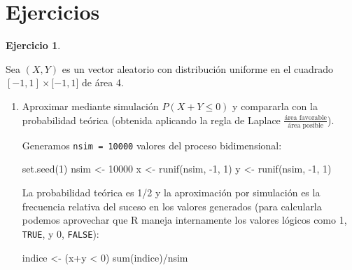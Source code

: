 \documentclass[
]{book}
\newenvironment{Shaded}{\begin{snugshade}}{\end{snugshade}}
\newcommand{\DecValTok}[1]{\textcolor[rgb]{0.00,0.00,0.81}{#1}}
\newcommand{\FunctionTok}[1]{\textcolor[rgb]{0.00,0.00,0.00}{#1}}
\newcommand{\NormalTok}[1]{#1}
\newcommand{\OtherTok}[1]{\textcolor[rgb]{0.56,0.35,0.01}{#1}}
\newcommand{\SpecialCharTok}[1]{\textcolor[rgb]{0.00,0.00,0.00}{#1}}
\theoremstyle{break}
\theoremstyle{definition}
\theoremstyle{definition}
\theoremstyle{definition}
\newtheorem{exercise}{Ejercicio}[chapter]
\theoremstyle{definition}
\theoremstyle{remark}
\begin{document}
\hypertarget{ejercicios}{%
\section{Ejercicios}\label{ejercicios}}

\begin{exercise}
\protect\hypertarget{exr:simpi}{}{\label{exr:simpi} }
\end{exercise}

Sea \((X,Y)\) es un vector aleatorio con distribución uniforme en el
cuadrado \([-1,1]\times\lbrack-1,1]\) de área 4.

\begin{enumerate}
\def\labelenumi{\alph{enumi})}
\item
  Aproximar mediante simulación \(P\left(X + Y \leq 0 \right)\) y
  compararla con la probabilidad teórica (obtenida aplicando la
  regla de Laplace \(\frac{\text{área favorable}}{\text{área posible}}\)).

  Generamos \texttt{nsim\ =\ 10000} valores del proceso bidimensional:

\begin{Shaded}
\begin{Highlighting}[]
\FunctionTok{set.seed}\NormalTok{(}\DecValTok{1}\NormalTok{)}
\NormalTok{nsim }\OtherTok{\textless{}{-}} \DecValTok{10000}
\NormalTok{x }\OtherTok{\textless{}{-}} \FunctionTok{runif}\NormalTok{(nsim, }\SpecialCharTok{{-}}\DecValTok{1}\NormalTok{, }\DecValTok{1}\NormalTok{)}
\NormalTok{y }\OtherTok{\textless{}{-}} \FunctionTok{runif}\NormalTok{(nsim, }\SpecialCharTok{{-}}\DecValTok{1}\NormalTok{, }\DecValTok{1}\NormalTok{)}
\end{Highlighting}
\end{Shaded}

  La probabilidad teórica es 1/2 y la aproximación por simulación es la frecuencia relativa del suceso en los valores generados (para calcularla podemos aprovechar que R maneja internamente los valores lógicos como 1, \texttt{TRUE}, y 0, \texttt{FALSE}):

\begin{Shaded}
\begin{Highlighting}[]
\NormalTok{indice }\OtherTok{\textless{}{-}}\NormalTok{ (x}\SpecialCharTok{+}\NormalTok{y }\SpecialCharTok{\textless{}} \DecValTok{0}\NormalTok{)}
\FunctionTok{sum}\NormalTok{(indice)}\SpecialCharTok{/}\NormalTok{nsim}
\end{Highlighting}
\end{Shaded}


\end{enumerate}
\end{document}
